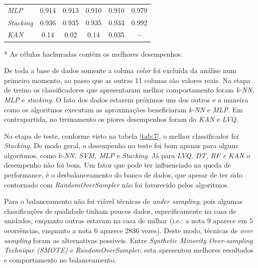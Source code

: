 \documentclass[journal]{IEEEtran}
\begin{document}
\begin{table}[h!]
\begin{threeparttable}
\begin{tabular}{lccccc}
			\multicolumn{1}{l|}{\textit{MLP}}                    & 0.914                      & 0.913                      & 0.910                      & 0.910                       & 0.979                      \\
			\multicolumn{1}{l|}{\textit{Stacking}}               & \cellcolor{lightgray}0.936 & \cellcolor{lightgray}0.935 & \cellcolor{lightgray}0.935 & \cellcolor{lightgray}0.934  & \cellcolor{lightgray}0.992 \\
			\multicolumn{1}{l|}{\textit{KAN}}                    & 0.14                       & 0.02                       & 0.14                       & 0.035                       & -                          \\
			\hline
		\end{tabular}
		\begin{tablenotes}\footnotesize
			\item[*] As células hachuradas contém os melhores desempenhos.
		\end{tablenotes}
	\end{threeparttable}
\end{table}

De toda a base de dados somente a coluna \textit{color} foi excluída da análise num primeiro momento, ao passo que as outras 11 colunas são valores reais. Na etapa de treino os classificadores que apresentaram melhor comportamento foram \textit{k-NN, MLP} e \textit{stacking}. O fato dos dados estarem próximos uns dos outros e a maneira como os algoritmos executam as aproximações beneficiaram \textit{k-NN} e \textit{MLP}. Em contrapartida, no treinamento os piores desempenhos foram do \textit{KAN} e \textit{LVQ}.

Na etapa de teste, conforme visto na tabela \ref{tab:7}, o melhor classificador  foi \textit{Stacking}. De modo geral, o desempenho no teste foi bom apenas para alguns algoritmos, como \textit{k-NN, SVM, MLP} e \textit{Stacking}. Já para \textit{LVQ, DT, RF e KAN} o desempenho não foi bom. Um fator que pode ter influenciado na queda de performance, é o desbalanceamento do banco de dados, que apesar de ter sido contornado com \textit{RandomOverSampler} não foi favorecido pelos algoritmos.

Para o balanceamento não foi viável técnicas de \textit{under sampling}, pois algumas classificações de qualidade tinham poucos dados, especificamente na casa de unidades, enquanto outras estavam na casa de milhar (i.e.: a nota 9 aparece em 5 ocorrências, enquanto a nota 6 aparece 2836 vezes). Deste modo, técnicas de \textit{over sampling} foram as alternativas possíveis. Entre \textit{Synthetic Minority Over-sampling Technique (SMOTE)} e \textit{RandomOverSampler}, esta apresentou melhores resultados e comportamento no balanceamento.
\end{document}
